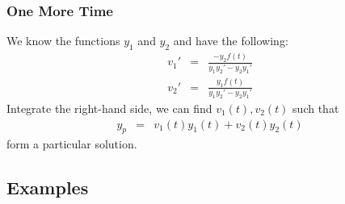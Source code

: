 \begin{frame}
  \frametitle{One More Time}

  We know the functions $y_1$ and $y_2$ and have the following:
  \begin{eqnarray*}
    v_1' & = & \frac{ -y_2 f(t)}{y_1 y_2'-y_2 y_1'} \\
    v_2' & = & \frac{y_1 f(t)}{y_1 y_2'-y_2 y_1'}
  \end{eqnarray*}
  Integrate the right-hand side, we can find $v_1(t), v_2(t)$ such that
  \begin{eqnarray*}
      y_p & = & v_1(t) y_1(t) + v_2(t) y_2(t)
    \end{eqnarray*}
  form a particular solution.
\end{frame}

\subsection{Examples}


